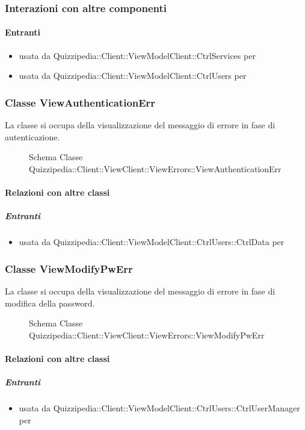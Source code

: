 \subsubsection{Interazioni con altre componenti}
\paragraph{Entranti}
\begin{itemize}
\item usata da Quizzipedia::Client::ViewModelClient::CtrlServices per 
\item usata da Quizzipedia::Client::ViewModelClient::CtrlUsers per 
\end{itemize}
\subsubsection{Classe ViewAuthenticationErr}
La classe si occupa della visualizzazione del messaggio di errore in fase di autenticazione.
\begin{figure}[H]
\centering
\noindent{}
\caption[Schema Classe ViewAuthenticationErr]{Schema Classe Quizzipedia::Client::ViewClient::ViewErrors::ViewAuthenticationErr}
\end{figure}
\paragraph{Relazioni con altre classi}
\subparagraph{Entranti}
\begin{itemize}
\item usata da Quizzipedia::Client::ViewModelClient::CtrlUsers::CtrlData per 
\end{itemize}
\subsubsection{Classe ViewModifyPwErr}
La classe si occupa della visualizzazione del messaggio di errore in fase di modifica della password.
\begin{figure}[H]
\centering
\noindent{}
\caption[Schema Classe ViewModifyPwErr]{Schema Classe Quizzipedia::Client::ViewClient::ViewErrors::ViewModifyPwErr}
\end{figure}
\paragraph{Relazioni con altre classi}
\subparagraph{Entranti}
\begin{itemize}
\item usata da Quizzipedia::Client::ViewModelClient::CtrlUsers::CtrlUserManager per 
\end{itemize}
